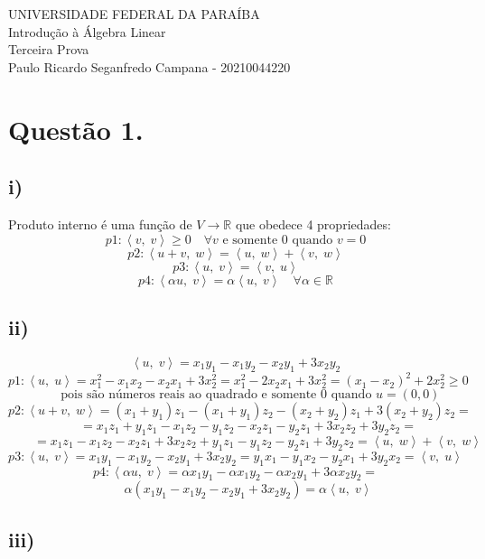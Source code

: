 \documentclass[12pt]{article}
\begin{document}
\setcounter{secnumdepth}{0}
\newcommand{\p}[2]{\left\langle#1,\;#2\right\rangle}
\newcommand{\norma}[1]{\left\|\left(#1\right)\right\|}
\begin{center}
	UNIVERSIDADE FEDERAL DA PARAÍBA\\
	Introdução à Álgebra Linear\\
	Terceira Prova\\
	Paulo Ricardo Seganfredo Campana - 20210044220
\end{center}

\section{Questão 1.}
\subsection{i)}

Produto interno é uma função de $V \longrightarrow \mathds{R}$ que obedece 4 propriedades:\\
\[p1: \p{v}{v} \geq 0 \quad \forall v \text{ e somente 0 quando } v=0\]
\[p2: \p{u+v}{w} = \p{u}{w}+\p{v}{w}\]
\[p3: \p{u}{v} = \p{v}{u}\]
\[p4: \p{\alpha u}{v} = \alpha \p{u}{v} \quad \forall \alpha \in \mathds{R}\]

\subsection{ii)}

\[\p{u}{v} = x_{1}y_{1}-x_{1}y_{2}-x_{2}y_{1}+3x_{2}y_{2}\]
\[p1: \p{u}{u} = x_{1}^{2}-x_{1}x_{2}-x_{2}x_{1}+3x_{2}^{2} = x_{1}^{2}-2x_{2}x_{1}+3x_{2}^{2} = (x_{1}-x_{2})^{2}+2x_{2}^{2} \geq 0\]
\[\qquad \text{ pois são números reais ao quadrado e somente } 0 \text{ quando } u = (0,0)\]
\[p2: \p{u+v}{w} = (x_{1}+y_{1})z_{1}-(x_{1}+y_{1})z_{2}-(x_{2}+y_{2})z_{1}+3(x_{2}+y_{2})z_{2} =\]
\[\qquad = x_{1}z_{1}+y_{1}z_{1}-x_{1}z_{2}-y_{1}z_{2}-x_{2}z_{1}-y_{2}z_{1}+3x_{2}z_{2}+3y_{2}z_{2} =\]
\[\qquad = x_{1}z_{1}-x_{1}z_{2}-x_{2}z_{1}+3x_{2}z_{2}+y_{1}z_{1}-y_{1}z_{2}-y_{2}z_{1}+3y_{2}z_{2} = \p{u}{w}+\p{v}{w}\]
\[p3: \p{u}{v} = x_{1}y_{1}-x_{1}y_{2}-x_{2}y_{1}+3x_{2}y_{2} = y_{1}x_{1}-y_{1}x_{2}-y_{2}x_{1}+3y_{2}x_{2} = \p{v}{u}\]
\[p4: \p{\alpha u}{v} = \alpha x_{1}y_{1}-\alpha x_{1}y_{2}-\alpha x_{2}y_{1}+3\alpha x_{2}y_{2} =\]
\[\qquad \alpha(x_{1}y_{1}-x_{1}y_{2}-x_{2}y_{1}+3x_{2}y_{2}) = \alpha \p{u}{v}\]

\subsection{iii)}
\end{document}
